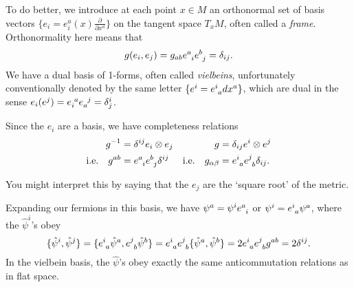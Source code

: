 To do better, we introduce at each point  $x \in M$  an orthonormal set of basis vectors $\{e_i = e_i^a(x) \frac{\partial }{\partial x^{a}}\}$ on the tangent space $T_x M$, often called a \emph{frame}.
Orthonormality here means that 
\begin{equation}
  g(e_i, e_j) = g_{ab} e\indices{^{a}_{i}} e\indices{^{b}_{j}} = \delta_{ij}.
\end{equation}
We have a dual basis of 1-forms, often called \emph{vielbeins}, unfortunately conventionally denoted by the same letter $\{e^i = e\indices{^{i}_{a}} dx^{a}\}$, which are dual in the sense $e_{i} (e^{j}) = e\indices{_{i}^{a}} e\indices{_{a}^{j}} = \delta^{i}_{j}$.

Since the $e_i$ are a basis, we have completeness relations
\begin{align}
  g^{-1} &= \delta^{ij} e_{i} \otimes e_{j} & g &= \delta_{ij} e^{i} \otimes e^{j} \\
  \text{i.e.} \quad g^{ab} &= e\indices{^{a}_{i}} e\indices{^{b}_{j}} \delta^{ij} & \text{i.e.} \quad g_{\alpha\beta} &= e\indices{^{i}_{a}} e\indices{^{j}_{b}} \delta_{ij}.
\end{align}
\begin{remark}
  You might interpret this by saying that the $e_j$ are the `square root' of the metric.
\end{remark}

Expanding our fermions in this basis, we have $\psi^{a} = \psi^{i} e\indices{^{a}_{i}}$ or $\psi^{i} = e\indices{^{i}_{a}} \psi^{a}$, where the $\hat{\psi}^{i}$'s obey 
\begin{equation}
  \{\hat{\psi}^{i}, \hat{\psi}^{j}\} = \{e\indices{^{i}_{a}} \hat{\psi}^{a} , e\indices{^{j}_{b}} \hat{\psi}^{b}\} = e\indices{^{i}_{a}} e\indices{^{j}_{b}} \{\hat{\psi}^{a}, \hat{\psi}^{b}\} = 2 e\indices{^{i}_{a}} e\indices{^{j}_{b}} g^{ab} = 2 \delta^{ij}.
\end{equation}
In the vielbein basis, the $\hat{\psi}$'s obey exactly the same anticommutation relations as in flat space.

